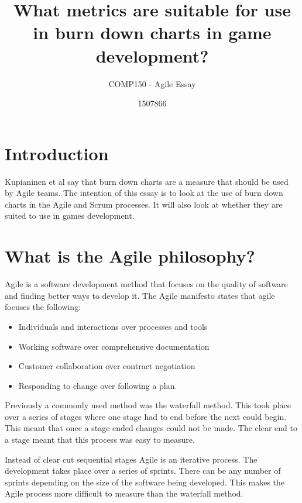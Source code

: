 \documentclass{scrartcl}
\title{What metrics are suitable for use in burn down charts in game development?}
\subtitle{COMP150 - Agile Essay}
\author{1507866}
\begin{document}
	
\maketitle
	

	
\section{Introduction}
Kupianinen et al say that burn down charts are a measure that should be used by Agile teams. \cite{Kupiainen} The intention of this essay is to look at the use of burn down charts in the Agile and Scrum processes. It will also look at whether they are suited to use in games development.

\section{What is the Agile philosophy?}

Agile is a software development method that focuses on the quality of software and finding better ways to develop it. The Agile manifesto states that agile focuses the following:

\begin{itemize}
	\item Individuals and interactions over processes and tools
	\item Working software over comprehensive documentation
	\item Customer collaboration over contract negotiation
	\item Responding to change over following a plan. \cite{AgileManifesto}  
\end{itemize} 

Previously a commonly used method was the waterfall method. This took place over a series of stages where one stage had to end before the next could begin. This meant that once a stage ended changes could not be made. The clear end to a stage meant that this process was easy to measure.\cite{Duka}

Instead of clear cut sequential stages Agile is an iterative process. The development takes place over a series of sprints. There can be any number of sprints depending on the size of the software being developed. This makes the Agile process more difficult to measure than the waterfall method.
\end{document}
